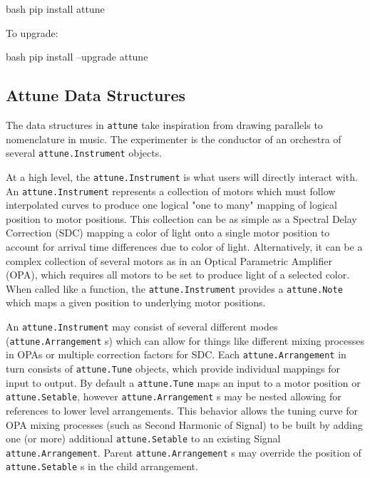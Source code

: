 \begin{codefragment}{bash}
pip install attune
\end{codefragment}

To upgrade:

\begin{codefragment}{bash}
pip install --upgrade attune
\end{codefragment}
\hypertarget{attune-data-structures}{%
\subsection{Attune Data Structures}\label{attune-data-structures}}

The data structures in \texttt{attune} take inspiration from drawing
parallels to nomenclature in music. The experimenter is the conductor of
an orchestra of several \texttt{attune.Instrument}
objects.

At a high level, the \texttt{attune.Instrument} is what
users will directly interact with. An
\texttt{attune.Instrument} represents a collection of
motors which must follow interpolated curves to produce one logical "one
to many" mapping of logical position to motor positions. This collection
can be as simple as a Spectral Delay Correction (SDC) mapping a color of
light onto a single motor position to account for arrival time
differences due to color of light. Alternatively, it can be a complex
collection of several motors as in an Optical Parametric Amplifier
(OPA), which requires all motors to be set to produce light of a
selected color. When called like a function, the
\texttt{attune.Instrument} provides a
\texttt{attune.Note} which maps a given position to
underlying motor positions.

An \texttt{attune.Instrument} may consist of several
different modes (\texttt{attune.Arrangement} s) which
can allow for things like different mixing processes in OPAs or multiple
correction factors for SDC. Each
\texttt{attune.Arrangement} in turn consists of
\texttt{attune.Tune} objects, which provide individual
mappings for input to output. By default a
\texttt{attune.Tune} maps an input to a motor position
or \texttt{attune.Setable}, however
\texttt{attune.Arrangement} s may be nested allowing
for references to lower level arrangements. This behavior allows the
tuning curve for OPA mixing processes (such as Second Harmonic of
Signal) to be built by adding one (or more) additional
\texttt{attune.Setable} to an existing Signal
\texttt{attune.Arrangement}. Parent
\texttt{attune.Arrangement} s may override the position
of \texttt{attune.Setable} s in the child arrangement.

